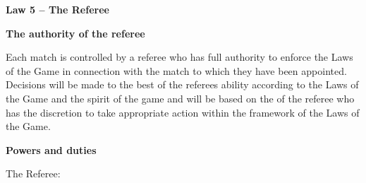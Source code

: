 \clearpage
\sffamily
{\bfseries\color[rgb]{0.4,0.4,0.4}
Law 5 -- The Referee}
{}

\bigskip

{\bfseries The authority of the referee}

\headlinebox

Each match is controlled by a  referee who has full authority to enforce the Laws
of the Game in connection with the match to which they have been appointed.
Decisions will be made to the best of the referees ability according to the Laws
of the Game and the spirit of the game and will be based on the   of the
referee who has the discretion to take appropriate action within the framework
of the Laws of the Game.


\bigskip

{\bfseries Powers and duties}

\headlinebox

The  Referee:

